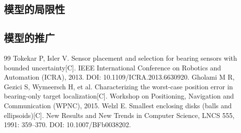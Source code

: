 \documentclass[UTF8,a4paper,zihao=-4,fontset=none]{ctexart}
\begin{document}
\subsection{模型的局限性}


\subsection{模型的推广}


\begin{thebibliography}{99}
   Tokekar P, Isler V. Sensor placement and selection for bearing sensors with bounded uncertainty[C]. IEEE International Conference on Robotics and Automation (ICRA), 2013. DOI: 10.1109/ICRA.2013.6630920.
   Gholami M R, Gezici S, Wymeersch H, et al. Characterizing the worst-case position error in bearing-only target localization[C]. Workshop on Positioning, Navigation and Communication (WPNC), 2015.
   Welzl E. Smallest enclosing disks (balls and ellipsoids)[C]. New Results and New Trends in Computer Science, LNCS 555, 1991: 359--370. DOI: 10.1007/BFb0038202.
\end{thebibliography}
\end{document}
